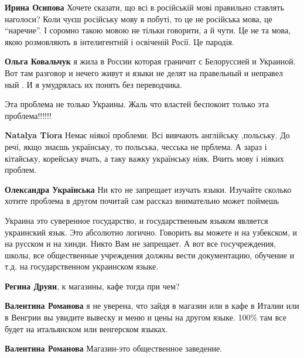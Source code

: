 \begin{itemize}
\begin{itemize}
\textbf{Ирина Осипова} Хочете сказати, що всі в російській мові правильно ставлять
наголоси? Коли чуєш російську мову в побуті, то це не російська мова, це
\enquote{наречие}. І соромно такою мовою не тільки говорити, а й чути. Це не та мова,
якою розмовляють в інтелигентній і освіченій Росії. Це пародія.


\textbf{Ольга Ковальчук} я жила в России которая граничит с Белоруссией и Украиной. Вот
там разговор и нечего живут и языки не делят на правельный и неправел ный . И я
умудрялась их понять без переводчика.

\end{itemize}


Эта проблема не только Украины. Жаль что властей беспокоит только эта проблема!!!!!!

\begin{itemize}
\textbf{Natalya Tiora} Немає ніякої проблеми. Всі вивчають англійську
,польську. До речі, якщо знаєшь українську, то польська, чесська не прблема. А
зараз і кітайську, корейську вчать, а таку важку українську ніяк. Вчить мову і
ніяких проблем.

\textbf{Олександра Українська} 
Ни кто не запрещает изучать языки. Изучайте сколько хотите
проблема в другом почитай сам рассказ внимательно может поймешь
\end{itemize}


Украина это суверенное государство, и государственным языком является
украинский язык. Это абсолютно логично. Говорить вы можете и на узбекском, и на
русском и на хинди. Никто Вам не запрещает. А вот все госучреждения, школы, все
общественные учреждения должны вести документацию, обучение и т.д. на
государственном украинском языке.

\begin{itemize}
\textbf{Регина Друян}, к магазины, кафе тогда при чем?


\textbf{Валентина Романова} я не уверена, что зайдя в магазин или в кафе в
Италии или в Венгрии вы увидите вывеску и меню и цены на другом языке. 100\% там
все будет на итальянском или венгерском языках.

\textbf{Валентина Романова} Магазин-это общественное заведение.


\end{itemize}
\end{itemize}
